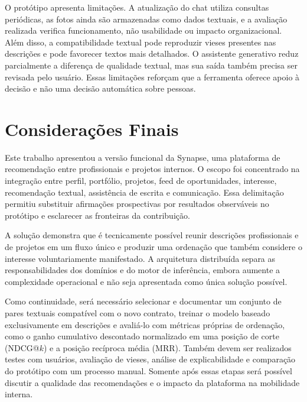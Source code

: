 \documentclass[12pt]{article}
\begin{document}
O protótipo apresenta limitações. A atualização do chat utiliza consultas periódicas, as fotos ainda são armazenadas como dados textuais, e a avaliação realizada verifica funcionamento, não usabilidade ou impacto organizacional. Além disso, a compatibilidade textual pode reproduzir vieses presentes nas descrições e pode favorecer textos mais detalhados. O assistente generativo reduz parcialmente a diferença de qualidade textual, mas sua saída também precisa ser revisada pelo usuário. Essas limitações reforçam que a ferramenta oferece apoio à decisão e não uma decisão automática sobre pessoas.

\section{Considerações Finais}

Este trabalho apresentou a versão funcional da Synapse, uma plataforma de recomendação entre profissionais e projetos internos. O escopo foi concentrado na integração entre perfil, portfólio, projetos, feed de oportunidades, interesse, recomendação textual, assistência de escrita e comunicação. Essa delimitação permitiu substituir afirmações prospectivas por resultados observáveis no protótipo e esclarecer as fronteiras da contribuição.

A solução demonstra que é tecnicamente possível reunir descrições profissionais e de projetos em um fluxo único e produzir uma ordenação que também considere o interesse voluntariamente manifestado. A arquitetura distribuída separa as responsabilidades dos domínios e do motor de inferência, embora aumente a complexidade operacional e não seja apresentada como única solução possível.

Como continuidade, será necessário selecionar e documentar um conjunto de pares textuais compatível com o novo contrato, treinar o modelo baseado exclusivamente em descrições e avaliá-lo com métricas próprias de ordenação, como o ganho cumulativo descontado normalizado em uma posição de corte (NDCG@$k$) e a posição recíproca média (MRR). Também devem ser realizados testes com usuários, avaliação de vieses, análise de explicabilidade e comparação do protótipo com um processo manual. Somente após essas etapas será possível discutir a qualidade das recomendações e o impacto da plataforma na mobilidade interna.



\end{document}
